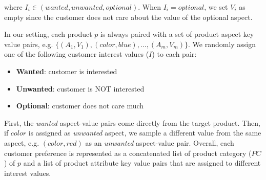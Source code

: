 where $I_i \in (wanted, unwanted, optional)$. When $I_i=optional$, we set $V_i$ as empty since the customer does not care about the value of the optional aspect.

\iffalse
In our setting, each product $p$ is always paired with a set of product aspect key value pairs, e.g. $\{(A_1, V_1), (color, blue), ..., (A_m, V_m)\}$. %
We randomly assign one of the following customer interest values ($I$) to each pair:
\vspace{-0.5em}
\begin{itemize}
\setlength\itemsep{-0.5em}
    \item \textbf{Wanted}: customer is interested
    \item \textbf{Unwanted}: customer is NOT interested
    \item \textbf{Optional}: customer does not care much
\end{itemize}
\vspace{-0.5em}
First, the \textit{wanted} aspect-value pairs come directly from the target product. Then, if $color$ is assigned as \textit{unwanted} aspect, %
we sample a different value from the same aspect, e.g. $(color, red)$ as an \textit{unwanted} aspect-value pair.
Overall, each customer preference is represented as a concatenated list of product category ($PC$) of $p$ and a list of product attribute key value pairs that are assigned to different interest values.

